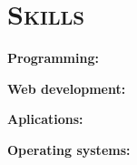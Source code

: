 \section*{\textsc{Skills}}
\textbf{Programming:} 

\textbf{Web development:} 

\textbf{Aplications:} 

\textbf{Operating systems:} 